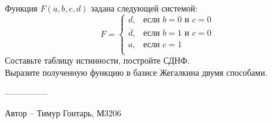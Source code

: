 \question
Функция $F(a, b, c, d)$ задана следующей системой:
\begin{equation*}
    F =
    \begin{cases}
        d, &\text{если $b=0$ и $c=0$}\\
        \overline{d}, &\text{если $b=1$ и $c=0$}\\
        a, &\text{если $c=1$}\\
    \end{cases}
\end{equation*}
Составьте таблицу истинности, постройте СДНФ.
\\
Выразите полученную функцию в базисе Жегалкина двумя способами.

---------------

Автор -- Тимур Гонтарь, М3206
